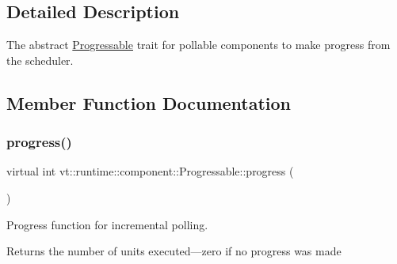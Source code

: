 \subsection{Detailed Description}
The abstract {\ttfamily \hyperlink{structvt_1_1runtime_1_1component_1_1_progressable}{Progressable}} trait for pollable components to make progress from the scheduler. 

\subsection{Member Function Documentation}
\mbox{\label{structvt_1_1runtime_1_1component_1_1_progressable_a37e883d4822db4f1effa9587b9f1160d}} 
\subsubsection{\texorpdfstring{progress()}{progress()}}
{\footnotesize\ttfamily virtual int vt\+::runtime\+::component\+::\+Progressable\+::progress (\begin{DoxyParamCaption}{ }\end{DoxyParamCaption})\hspace{0.3cm}{\ttfamily [pure virtual]}}



Progress function for incremental polling. 

\begin{DoxyReturn}{Returns}
the number of units executed---zero if no progress was made 
\end{DoxyReturn}


